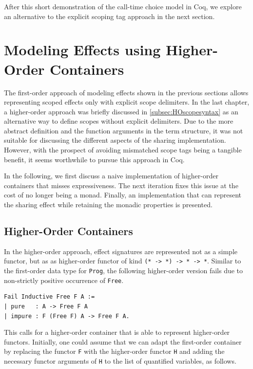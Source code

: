 \documentclass[a4paper, 11pt, fleqn, twoside, abstract=on]{scrreprt}
\newcommand{\hinl}[1]{\texttt{#1}}
\newcommand{\cinl}[1]{\texttt{#1}}
\begin{document}
After this short demonstration of the call-time choice model in Coq, we explore an alternative to the explicit scoping tag approach in the next section.

\section{Modeling Effects using Higher-Order Containers}
\label{sec:coqHO}

The first-order approach of modeling effects shown in the previous sections allows representing scoped effects only with explicit scope delimiters.
In the last chapter, a higher-order approach was briefly discussed in \autoref{subsec:HOscopesyntax} as an alternative way to define scopes without explicit delimiters.
Due to the more abstract definition and the function arguments in the term structure, it was not suitable for discussing the different aspects of the sharing implementation.
However, with the prospect of avoiding mismatched scope tags being a tangible benefit, it seems worthwhile to pursue this approach in Coq.

In the following, we first discuss a naive implementation of higher-order containers that misses expressiveness.
The next iteration fixes this issue at the cost of no longer being a monad.
Finally, an implementation that can represent the sharing effect while retaining the monadic properties is presented.

\subsection{Higher-Order Containers}
\label{subsec-higherOrderContainers}
In the higher-order approach, effect signatures are represented not as a simple functor, but as as higher-order functor of kind \hinl{(* -> *) -> * -> *}.
Similar to the first-order data type for \hinl{Prog}, the following higher-order version fails due to non-strictly positive occurrence of \cinl{Free}.

\begin{verbatim}
Fail Inductive Free F A :=
| pure   : A -> Free F A
| impure : F (Free F) A -> Free F A.
\end{verbatim}
\noindent
This calls for a higher-order container that is able to represent higher-order functors.
Initially, one could assume that we can adapt the first-order container by replacing the functor \cinl{F} with the higher-order functor \cinl{H} and adding the necessary functor arguments of \cinl{H} to the list of quantified variables, as follows.
\end{document}
